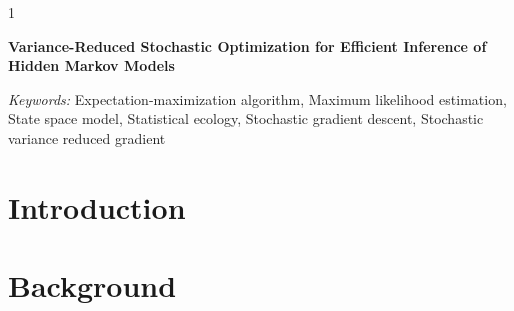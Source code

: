 \documentclass[12pt]{article}
\newcommand{\blind}{1}
\begin{document}
\blind
{
  \bigskip
  \bigskip
  \bigskip
  \begin{center}
    {\LARGE\bf Variance-Reduced Stochastic Optimization for Efficient Inference of Hidden Markov Models}
  \end{center}
  \medskip
} \fi

\bigskip
\begin{abstract}
    Hidden Markov models (HMMs) are popular models to identify a finite number of discrete latent states from sequential data. However, fitting them to large data sets can be computationally demanding as it usually requires iterating through the entire underlying data set for every parameter update. Specifically, numerical optimization methods require a full pass of the data to evaluate the gradient of the likelihood, and the expectation-maximization (EM) algorithm requires a full data pass to perform its E step before each parameter update. %
    We propose an optimization algorithm that updates the parameters of an HMM without iterating through the entire data set. Namely, we combine a partial E step with variance-reduced stochastic optimization within the M step, and prove the algorithm converges under certain regularity conditions. Using a simulation study and kinematic data from eight killer whales ({\em{Orcinus orca}}) off the western coast of Canada, we show that our algorithm converges in fewer epochs compared to standard numerical optimization techniques. It also tends to converge to parameter estimates with higher likelihoods than those baselines. In summary, our algorithm allows practitioners to fit complicated HMMs to large time-series data sets more efficiently than existing baselines.
\end{abstract}

\noindent%
{\it Keywords:} Expectation-maximization algorithm, Maximum likelihood estimation, State space model, Statistical ecology, Stochastic gradient descent, Stochastic variance reduced gradient
\vfill 

\newpage
{} %

\section{Introduction}


\section{Background}

\end{document}
